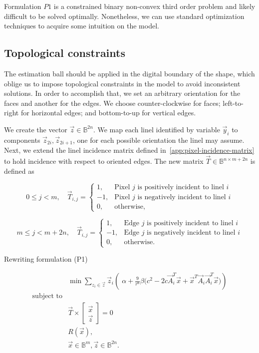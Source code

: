 	Formulation $P1$ is a constrained binary non-convex third order problem and likely difficult to be solved optimally. Nonetheless, we can use standard optimization techniques to acquire some intuition on the model. 	
	
\subsection{Topological constraints}
\label{ch6:subsec:topological-constraints}

The estimation ball should be applied in the digital boundary of the shape, which oblige us to impose topological constraints in the model to avoid inconsistent solutions. In order to accomplish that, we set an arbitrary orientation for the faces and another for the edges. We choose counter-clockwise for faces; left-to-right for horizontal edges; and bottom-to-up for vertical edges.


We create the vector $\vec{z} \in \mathbb{B}^{2n}$. We map each linel identified by variable $\vec{y}_i$ to components $\vec{z}_{2i},\vec{z}_{2i+1}$, one for each possible orientation the linel may assume. Next, we extend the linel incidence matrix defined in~\cref{app:pixel-incidence-matrix} to hold incidence with respect to oriented edges. The new matrix $\vec{T} \in \mathbb{B}^{n \times m + 2n}$ is defined as

\[
	0 \leq j < m, \quad \vec{T}_{i,j} = \left\{ \begin{array}{ll}
	
	1,& \text{Pixel $j$ is positively incident to linel $i$}\\
	-1,& \text{Pixel $j$ is negatively incident to linel $i$}\\	
	0,& \text{otherwise},
	\end{array}\right.
\]

\[
	m \leq j < m + 2n, \quad \vec{T}_{i,j} = \left\{ \begin{array}{ll}
	
	1,& \text{Edge $j$ is positively incident to linel $i$}\\
	-1,& \text{Edge $j$ is negatively incident to linel $i$}\\	
	0,& \text{otherwise}.
	\end{array}\right.
\]

Rewriting formulation (P1)

\[
\begin{array}{ll}
& \displaystyle	\min \sum_{z_i \in \vec{z}}{ \vec{z}_i \left(\; \alpha + \frac{9}{r^6}\beta \big(c^2 - 2c\vec{A}_i^T\vec{x} + \vec{x}^T\vec{A}_i\vec{A}_i^T\vec{x}\big)\right)} \\
\text{subject to}\\
&	\vec{T} \times  \left[ \begin{array}{c}
							\vec{x} \\ 
							\vec{z} 
						   \end{array} \right] = 0 \\
&   R(\vec{x}),\\
&   \vec{x} \in \mathbb{B}^{m}, \vec{z} \in \mathbb{B}^{2n}.
\end{array}
\]


